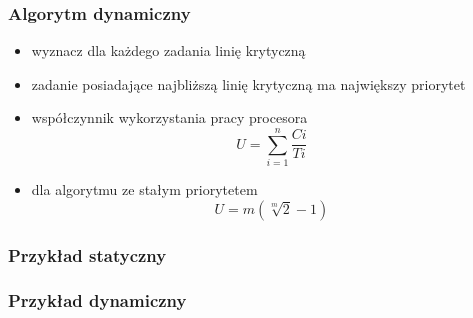 \documentclass[12pt,a4paper]{article}
\begin{document}
\subsubsection{Algorytm dynamiczny}
\begin{itemize}
\item wyznacz dla każdego zadania linię krytyczną
\item zadanie posiadające najbliższą linię krytyczną ma największy priorytet
\item współczynnik wykorzystania pracy procesora
\begin{equation}
U=\sum\limits_{i=1}^{n}\frac{Ci}{Ti}
\end{equation}
\item dla algorytmu ze stałym priorytetem
\begin{equation}
U=m(\sqrt[m]{2}-1)
\end{equation}
\end{itemize}
\subsubsection{Przykład statyczny}
\subsubsection{Przykład dynamiczny}
\end{document}

